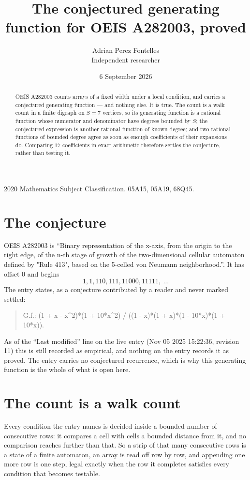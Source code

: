 \documentclass[11pt,a4paper]{article}
\title{The conjectured generating function for OEIS A282003, proved}
\author{Adrian Perez Fontelles\\ \small Independent researcher}
\date{6 September 2026}
\theoremstyle{plain}
\theoremstyle{definition}
\begin{document}
\maketitle

\begin{abstract}
OEIS A282003 counts arrays of a fixed width under a local condition, and carries a conjectured
generating function --- and nothing else. It is true. The count is a walk count in a finite
digraph on $S=7$ vertices, so its generating function is a rational function whose numerator
and denominator have degrees bounded by $S$; the conjectured expression is another rational
function of known degree; and two rational functions of bounded degree agree as soon as enough
coefficients of their expansions do. Comparing $17$ coefficients in exact arithmetic
therefore settles the conjecture, rather than testing it.
\end{abstract}

\noindent\small 2020 Mathematics Subject Classification. 05A15, 05A19, 68Q45.\normalsize

\section{The conjecture}

OEIS A282003 is ``Binary representation of the x-axis, from the origin to the right edge, of the n-th stage of growth of the two-dimensional cellular automaton defined by "Rule 413", based on the 5-celled von Neumann neighborhood.''. It has offset $0$ and begins
\[
1, 1, 110, 111, 11000, 11111,\ \dots
\]
The entry states, as a conjecture contributed by a reader and never marked settled:
\begin{quote}
G.f.: (1 + x - x\^{}2)*(1 + 10*x\^{}2) / ((1 - x)*(1 + x)*(1 - 10*x)*(1 + 10*x)).
\end{quote}
As of the ``Last modified'' line on the live entry (Nov 05 2025 15:22:36, revision 11) this is still
recorded as empirical, and nothing on the entry records it as proved. The entry carries no
conjectured recurrence, which is why this generating function is the whole of what is open
here.

\section{The count is a walk count}

Every condition the entry names is decided inside a bounded number of consecutive rows: it
compares a cell with cells a bounded distance from it, and no comparison reaches further than
that. So a strip of that many consecutive rows is a state of a finite automaton, an array is
read off row by row, and appending one more row is one step, legal exactly when the row it
completes satisfies every condition that becomes testable.
\end{document}
